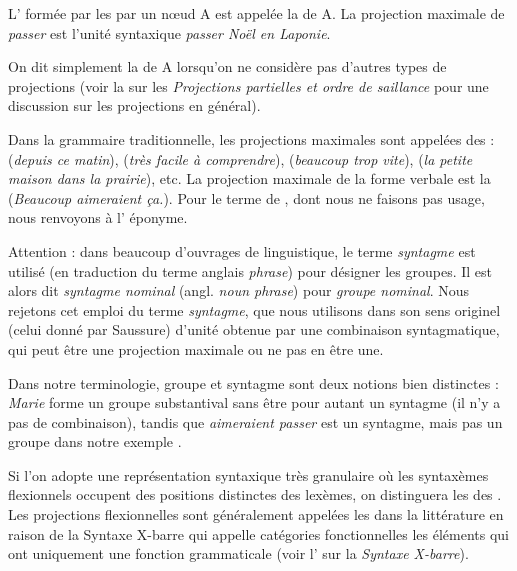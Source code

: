 {L’ formée par les  par un nœud A est appelée la  de A.}
La projection maximale de \textit{passer} est l’unité syntaxique \textit{passer Noël en Laponie}.

On dit simplement la  de A lorsqu’on ne considère pas d’autres types de projections (voir la  sur les \textit{Projections partielles et ordre de saillance} pour une discussion sur les projections en général).

Dans la grammaire traditionnelle, les projections maximales sont appelées des :  (\textit{depuis ce matin}),  (\textit{très facile à comprendre}),  (\textit{beaucoup trop vite}),  (\textit{la petite maison dans la prairie}), etc. La projection maximale de la forme verbale est la  (\textit{Beaucoup aimeraient ça.}). Pour le terme de , dont nous ne faisons pas usage, nous renvoyons à l’ éponyme.

\begin{tblsframed}{}
\noindent Attention : dans beaucoup d’ouvrages de linguistique, le terme \textit{syntagme} est utilisé (en traduction du terme anglais \textit{phrase}) pour désigner les groupes. Il est alors dit \textit{syntagme nominal} (angl. \textit{noun phrase}) pour \textit{groupe nominal}. Nous rejetons cet emploi du terme \textit{syntagme}, que nous utilisons dans son sens originel (celui donné par Saussure) d’unité obtenue par une combinaison syntagmatique, qui peut être une projection maximale ou ne pas en être une.

Dans notre terminologie, groupe et syntagme sont deux notions bien distinctes : \textit{Marie} forme un groupe substantival sans être pour autant un syntagme (il n’y a pas de combinaison), tandis que \textit{aimeraient passer} est un syntagme, mais pas un groupe dans notre exemple .
\end{tblsframed}



Si l’on adopte une représentation syntaxique très granulaire où les syntaxèmes flexionnels occupent des positions distinctes des lexèmes, on distinguera les  des . Les projections flexionnelles sont généralement appelées les  dans la littérature en raison de la Syntaxe X-barre qui appelle catégories fonctionnelles les éléments qui ont uniquement une fonction grammaticale (voir l’ sur la \textit{Syntaxe X-barre}).\largerpage[2]

